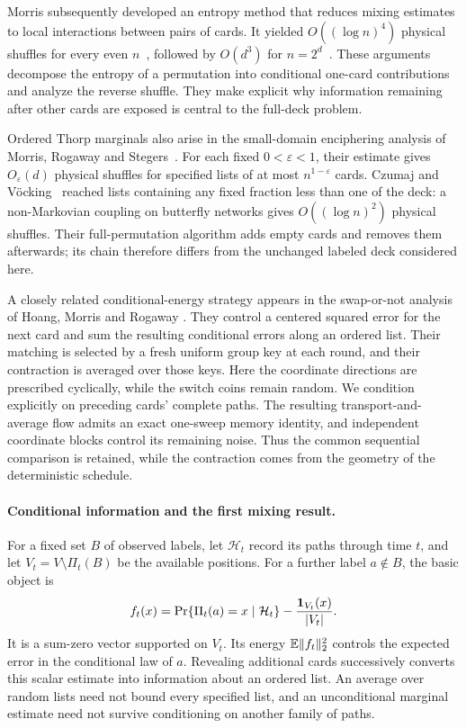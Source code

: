 Morris subsequently developed an entropy method that reduces mixing
estimates to local interactions between pairs of cards. It yielded
$O((\log n)^4)$ physical shuffles for every even $n$~\cite{morris4},
followed by $O(d^3)$ for $n=2^d$~\cite{morris3}. These arguments
decompose the entropy of a permutation into conditional one-card
contributions and analyze the reverse shuffle. They make explicit
why information remaining after other cards are exposed is central
to the full-deck problem.

Ordered Thorp marginals also arise in the small-domain enciphering
analysis of Morris, Rogaway and Stegers~\cite[Theorem~1]{mrs}.
For each fixed $0<\varepsilon<1$, their estimate gives
$O_\varepsilon(d)$ physical shuffles for specified lists of at most
$n^{1-\varepsilon}$ cards.
Czumaj and V\"ocking~\cite{CzumajVocking2014} reached lists containing
any fixed fraction less than one of the deck: a non-Markovian coupling
on butterfly networks gives $O((\log n)^2)$ physical shuffles.
Their full-permutation algorithm adds empty cards and removes them
afterwards; its chain therefore differs from the unchanged labeled
deck considered here.

A closely related conditional-energy strategy appears in the
swap-or-not analysis of Hoang, Morris and Rogaway
\cite[Section~3, Theorem~3 and Lemma~4]{hmr2014}.
They control a centered squared error for the next card and sum the
resulting conditional errors along an ordered list. Their matching
is selected by a fresh uniform group key at each round, and their
contraction is averaged over those keys. Here the coordinate directions
are prescribed cyclically, while the switch coins remain random.
We condition explicitly on preceding cards' complete paths. The
resulting transport-and-average flow admits an exact one-sweep memory
identity, and independent coordinate blocks control its remaining
noise. Thus the common sequential comparison is retained, while the
contraction comes from the geometry of the deterministic schedule.

\paragraph{Conditional information and the first mixing result.}
For a fixed set $B$ of observed labels, let $\mathcal H_t$ record its
paths through time $t$, and let $V_t=V\setminus\Pi_t(B)$ be the
available positions. For a further label $a\notin B$, the basic object is
\[
 f_t(x)=\Pr\{\Pi_t(a)=x\mid\mathcal H_t\}
             -\frac{\mathbf 1_{V_t}(x)}{|V_t|}.
\]
It is a sum-zero vector supported on $V_t$. Its energy
$\mathbb E\|f_t\|_2^2$ controls the expected error in the conditional law
of $a$. Revealing additional cards successively converts this scalar
estimate into information about an ordered list. An average over random
lists need not bound every specified list, and an unconditional marginal
estimate need not survive conditioning on another family of paths.

